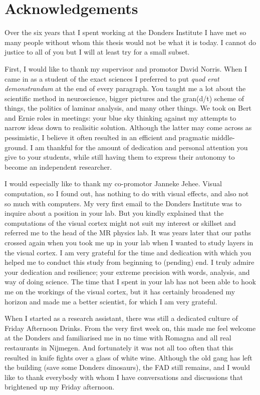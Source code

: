 \section{Acknowledgements}

Over the six years that I spent working at the Donders Institute I have met so many people without whom this thesis would not be what it is today. I cannot do justice to all of you but I will at least try for a small subset.

First, I would like to thank my supervisor and promotor David Norris. When I came in as a student of the exact sciences I preferred to put \emph{quod erat demonstrandum} at the end of every paragraph. You taught me a lot about the scientific method in neuroscience, bigger pictures and the gran(d/t) scheme of things, the politics of laminar analysis, and many other things. We took on Bert and Ernie roles in meetings: your blue sky thinking against my attempts to narrow ideas down to realisitic solution. Although the latter may come across as pessimistic, I believe it often resulted in an efficient and pragmatic middle-ground. I am thankful for the amount of dedication and personal attention you give to your students, while still having them to express their autonomy to become an independent researcher.

I would especially like to thank my co-promotor Janneke Jehee. Visual computation, so I found out, has nothing to do with visual effects, and also not so much with computers. My very first email to the Donders Institute was to inquire about a position in your lab. But you kindly explained that the computations of the visual cortex might not suit my interest or skillset and referred me to the head of the MR physics lab. It was years later that our paths crossed again when you took me up in your lab when I wanted to study layers in the visual cortex. I am very grateful for the time and dedication with which you helped me to conduct this study from beginning to (pending) end. I truly admire your dedication and resilience; your extreme precision with words, analysis, and way of doing science. The time that I spent in your lab has not been able to hook me on the workings of the visual cortex, but it has certainly broadened my horizon and made me a better scientist, for which I am very grateful.

When I started as a research assistant, there was still a dedicated culture of Friday Afternoon Drinks. From the very first week on, this made me feel welcome at the Donders and familiarised me in no time with Romagna and all real restaurants in Nijmegen. And fortunately it was not all too often that this resulted in knife fights over a glass of white wine. Although the old gang has left the building (save some Donders dinosaurs),  the FAD still remains, and I would like to thank everybody with whom I have conversations and discussions that brightened up my Friday afternoon.

